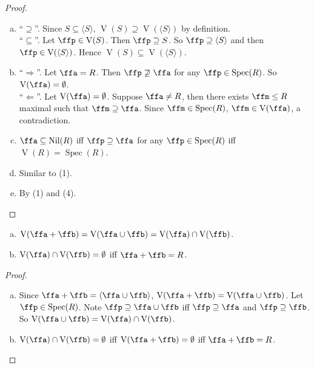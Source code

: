 \begin{proof}
    \begin{enumerate}[(a)]
        \item 
            ``$\supseteq$''. Since $S \subseteq \langle S \rangle$, $\operatorname{V}(S) \supseteq \operatorname{V}(\langle S \rangle)$ by definition. \\
            ``$\subseteq$''. Let $\ffp \in \operatorname{V}(S)$. Then $\ffp \supseteq S$. So $\ffp \supseteq \langle S \rangle$ and then $\ffp \in \operatorname{V}(\langle S \rangle)$. Hence $\operatorname{V}(S) \subseteq \operatorname{V}(\langle S \rangle)$.
        \item 
            ``$\Rightarrow$''. Let $\ffa = R$. Then $\ffp \not \supseteq \ffa$ for any $\ffp \in \operatorname{Spec}(R)$. So $\operatorname{V}(\ffa) = \emptyset$. \\
            ``$\Leftarrow$''. Let $\operatorname{V}(\ffa) = \emptyset$. Suppose $\ffa \neq R$, then there exists $\ffm \leq R$ maximal such that $\ffm \supseteq \ffa$. Since $\ffm \in \operatorname{Spec}(R)$, $\ffm \in \operatorname{V}(\ffa)$, a contradiction.
        \item $\ffa \subseteq \operatorname{Nil}(R)$ iff $\ffp \supseteq \ffa$ for any $\ffp \in \operatorname{Spec}(R)$ iff $\operatorname{V}(R) = \operatorname{Spec}(R)$.
        \item Similar to (1).
        \item By (1) and (4).
    \end{enumerate}
\end{proof}

\begin{proposition}
    \begin{enumerate}[(a)]
        \item $\operatorname{V}(\ffa + \ffb) = \operatorname{V}(\ffa \cup \ffb) = \operatorname{V}(\ffa) \cap \operatorname{V}(\ffb)$.
        \item $\operatorname{V}(\ffa) \cap \operatorname{V}(\ffb) = \emptyset$ iff $\ffa + \ffb = R$.
    \end{enumerate}
\end{proposition}

\begin{proof}
    \begin{enumerate}[(a)]
        \item 
            Since $\ffa + \ffb = \langle \ffa \cup \ffb \rangle$, $\operatorname{V}(\ffa + \ffb) = \operatorname{V}(\ffa \cup \ffb)$. Let $\ffp \in \operatorname{Spec}(R)$. Note $\ffp \supseteq \ffa \cup \ffb$ iff $\ffp \supseteq \ffa$ and $\ffp \supseteq \ffb$. So $\operatorname{V}(\ffa \cup \ffb) = \operatorname{V}(\ffa) \cap \operatorname{V}(\ffb)$.
        \item 
            $\operatorname{V}(\ffa) \cap \operatorname{V}(\ffb) = \emptyset$ iff $\operatorname{V}(\ffa + \ffb) = \emptyset$ iff $\ffa + \ffb = R$.
    \end{enumerate}
\end{proof}

